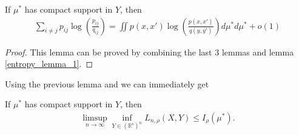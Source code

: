 \begin{lemma}
    If $\mu^*$ has compact support in $Y$, then
    \begin{align}
        \sum_{i \neq j} p_{ij} \log \left(\frac{p_{ij}}{q_{ij}}\right) = \iint p(x,x') \log\left(\frac{p(x,x')}{q(y,y')}\right) d\mu^* d\mu^* +o(1)
    \end{align}
\end{lemma}
\begin{proof}
    This lemma can be proved by combining the last 3 lemmas and lemma \ref{entropy_lemma_1}.
\end{proof}
Using the previous lemma and we can immediately get
\begin{proposition} \label{upper_bound_prop}
    If $\mu^*$ has compact support in $Y$, then
    \begin{align}
        \limsup_{n \to \infty} \inf_{Y \in (\mathbb{R}^s)^n} L_{n,\rho}(X,Y) \leq I_{\rho}(\mu^*).
    \end{align}
\end{proposition}
